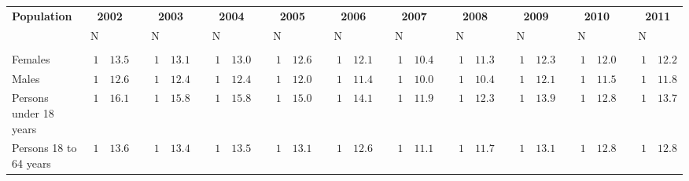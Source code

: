 \documentclass{article}\usepackage[]{graphicx}\usepackage[]{color}
\begin{document}
%
\begin{table}[!tbp]
\begin{center}
\begin{tabular}{lrrcrrcrrcrrcrrcrrcrrcrrcrrcrr}
\hline\hline
\multicolumn{1}{l}{\bfseries Population}&\multicolumn{2}{c}{\bfseries 2002}&\multicolumn{1}{c}{\bfseries }&\multicolumn{2}{c}{\bfseries 2003}&\multicolumn{1}{c}{\bfseries }&\multicolumn{2}{c}{\bfseries 2004}&\multicolumn{1}{c}{\bfseries }&\multicolumn{2}{c}{\bfseries 2005}&\multicolumn{1}{c}{\bfseries }&\multicolumn{2}{c}{\bfseries 2006}&\multicolumn{1}{c}{\bfseries }&\multicolumn{2}{c}{\bfseries 2007}&\multicolumn{1}{c}{\bfseries }&\multicolumn{2}{c}{\bfseries 2008}&\multicolumn{1}{c}{\bfseries }&\multicolumn{2}{c}{\bfseries 2009}&\multicolumn{1}{c}{\bfseries }&\multicolumn{2}{c}{\bfseries 2010}&\multicolumn{1}{c}{\bfseries }&\multicolumn{2}{c}{\bfseries 2011}\tabularnewline
\cline{2-3} \cline{5-6} \cline{8-9} \cline{11-12} \cline{14-15} \cline{17-18} \cline{20-21} \cline{23-24} \cline{26-27} \cline{29-30}
\multicolumn{1}{l}{}&\multicolumn{1}{c}{N}&\multicolumn{1}{c}{}&\multicolumn{1}{c}{}&\multicolumn{1}{c}{N}&\multicolumn{1}{c}{}&\multicolumn{1}{c}{}&\multicolumn{1}{c}{N}&\multicolumn{1}{c}{}&\multicolumn{1}{c}{}&\multicolumn{1}{c}{N}&\multicolumn{1}{c}{}&\multicolumn{1}{c}{}&\multicolumn{1}{c}{N}&\multicolumn{1}{c}{}&\multicolumn{1}{c}{}&\multicolumn{1}{c}{N}&\multicolumn{1}{c}{}&\multicolumn{1}{c}{}&\multicolumn{1}{c}{N}&\multicolumn{1}{c}{}&\multicolumn{1}{c}{}&\multicolumn{1}{c}{N}&\multicolumn{1}{c}{}&\multicolumn{1}{c}{}&\multicolumn{1}{c}{N}&\multicolumn{1}{c}{}&\multicolumn{1}{c}{}&\multicolumn{1}{c}{N}&\multicolumn{1}{c}{}\tabularnewline
\hline
&&&&&&&&&&&&&&&&&&&&&&&&&&&&&\tabularnewline
Females&$1$&$13.5$&&$1$&$13.1$&&$1$&$13.0$&&$1$&$12.6$&&$1$&$12.1$&&$1$&$10.4$&&$1$&$11.3$&&$1$&$12.3$&&$1$&$12.0$&&$1$&$12.2$\tabularnewline
Males&$1$&$12.6$&&$1$&$12.4$&&$1$&$12.4$&&$1$&$12.0$&&$1$&$11.4$&&$1$&$10.0$&&$1$&$10.4$&&$1$&$12.1$&&$1$&$11.5$&&$1$&$11.8$\tabularnewline
Persons under 18 years&$1$&$16.1$&&$1$&$15.8$&&$1$&$15.8$&&$1$&$15.0$&&$1$&$14.1$&&$1$&$11.9$&&$1$&$12.3$&&$1$&$13.9$&&$1$&$12.8$&&$1$&$13.7$\tabularnewline
Persons 18 to 64 years&$1$&$13.6$&&$1$&$13.4$&&$1$&$13.5$&&$1$&$13.1$&&$1$&$12.6$&&$1$&$11.1$&&$1$&$11.7$&&$1$&$13.1$&&$1$&$12.8$&&$1$&$12.8$\tabularnewline

\end{tabular}
\end{center}
\end{table}
\end{document}
